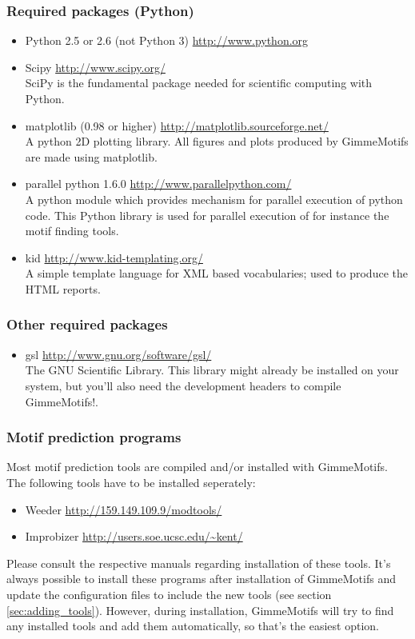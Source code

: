 \documentclass[11pt]{article}
\begin{document}
\subsubsection{Required packages (Python)}
\begin{itemize}
\item Python 2.5 or 2.6 (not Python 3) \url{http://www.python.org}
\item Scipy \url{http://www.scipy.org/} \\
SciPy is the fundamental package needed for scientific computing with Python. 
\item matplotlib (0.98 or higher) \url{http://matplotlib.sourceforge.net/} \\
A python 2D plotting library. All figures and plots produced by GimmeMotifs are made using matplotlib.
\item parallel python 1.6.0 \url{http://www.parallelpython.com/} \\
A python module which provides mechanism for parallel execution of python code. This Python library is used for parallel execution of for instance the motif finding tools. 
\item kid \url{http://www.kid-templating.org/} \\
A simple template language for XML based vocabularies; used to produce the HTML reports.
\end{itemize}

\subsubsection{Other required packages}
\begin{itemize}
 \item gsl \url{http://www.gnu.org/software/gsl/} \\
The GNU Scientific Library. 
This library might already be installed on your system, but you'll also need the development headers to compile GimmeMotifs!. 
\end{itemize}

\subsubsection{Motif prediction programs}
Most motif prediction tools are compiled and/or installed with GimmeMotifs. The following tools have to be installed seperately: 
\begin{itemize}
\item Weeder \cite{pavesi_weeder_2004} \url{http://159.149.109.9/modtools/}
\item Improbizer \cite{ao_environmentally_2004} \url{http://users.soe.ucsc.edu/~kent/}
\end{itemize}
Please consult the respective manuals regarding installation of these tools. It's always possible to install these programs after installation of GimmeMotifs and update the configuration files to include the new tools (see section \ref{sec:adding_tools}). However, during installation, GimmeMotifs will try to find any installed tools and add them automatically, so that's the easiest option.
\end{document}
